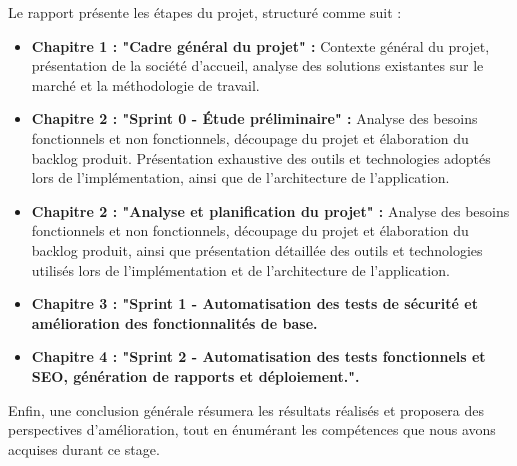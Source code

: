 \begin{justify}
        Le rapport présente les étapes du projet, structuré comme suit :
        \begin{itemize}[left=-0.1cm, label=$\bullet$]
            \item \textbf{Chapitre 1 : "Cadre général du projet" :} Contexte général du projet, présentation de la société d’accueil, analyse des solutions existantes sur le marché et la méthodologie de travail.
            \item \textbf{Chapitre 2 : "Sprint 0 - Étude préliminaire" :} Analyse des besoins fonctionnels et non fonctionnels, découpage du projet et élaboration du backlog produit. Présentation exhaustive des outils et technologies adoptés lors de l’implémentation, ainsi que de l’architecture de l’application.
            \item \textbf{Chapitre 2 : "Analyse et planification du projet" :} Analyse des besoins fonctionnels et non fonctionnels, découpage du projet et élaboration du backlog produit, ainsi que présentation détaillée des outils et technologies utilisés lors de l’implémentation et de l’architecture de l’application.
            \item \textbf{Chapitre 3 : "Sprint 1 -  Automatisation des tests de sécurité et amélioration des fonctionnalités de base.}
            \item \textbf{Chapitre 4 : "Sprint 2 - Automatisation des tests fonctionnels et SEO, génération de rapports et déploiement.".}
        \end{itemize}
        
        Enfin, une conclusion générale résumera les résultats réalisés et proposera des perspectives d’amélioration, tout en énumérant les compétences que nous avons acquises durant ce stage.
    \end{justify}
    
    
